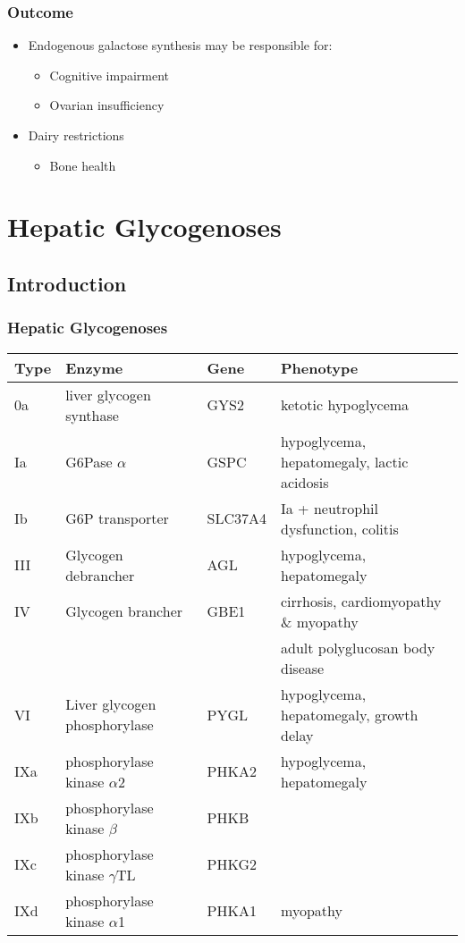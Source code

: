 \documentclass{scrartcl}
\begin{document}
\subsubsection{Outcome}
\label{sec:orgc658ace}
\begin{itemize}
\item Endogenous galactose synthesis may be responsible for:
\begin{itemize}
\item Cognitive impairment
\item Ovarian insufficiency
\end{itemize}
\item Dairy restrictions
\begin{itemize}
\item Bone health
\end{itemize}
\end{itemize}

\section{Hepatic Glycogenoses}
\label{sec:orgc16ef91}
\subsection{Introduction}
\label{sec:org1a0505c}

\subsubsection{Hepatic Glycogenoses}
\label{sec:orgdfa4a80}

\scriptsize
\begin{center}
\begin{tabular}{llll}
Type & Enzyme & Gene & Phenotype\\
\hline
0a & liver glycogen synthase & GYS2 & ketotic hypoglycema\\
Ia & G6Pase \(\alpha\) & GSPC & hypoglycema, hepatomegaly, lactic acidosis\\
Ib & G6P transporter & SLC37A4 & Ia + neutrophil dysfunction, colitis\\
III & Glycogen debrancher & AGL & hypoglycema, hepatomegaly\\
IV & Glycogen brancher & GBE1 & cirrhosis, cardiomyopathy \& myopathy\\
 &  &  & adult polyglucosan body disease\\
VI & Liver glycogen phosphorylase & PYGL & hypoglycema, hepatomegaly, growth delay\\
IXa & phosphorylase kinase \(\alpha\)2 & PHKA2 & hypoglycema, hepatomegaly\\
IXb & phosphorylase kinase \(\beta\) & PHKB & \\
IXc & phosphorylase kinase \(\gamma\)TL & PHKG2 & \\
IXd & phosphorylase kinase \(\alpha\)1 & PHKA1 & myopathy\\
\end{tabular}
\end{center}
\end{document}
